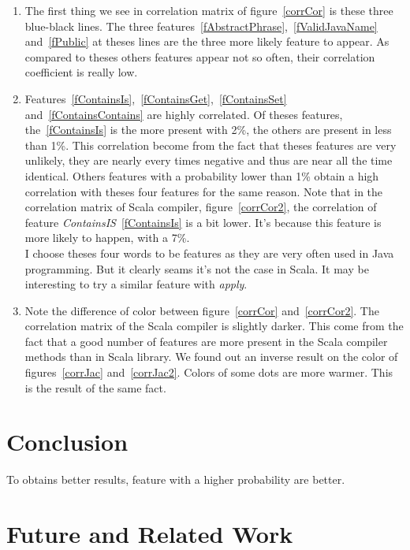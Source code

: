 \documentclass[12pt]{article}
\begin{document}
\begin{enumerate}
\item The first thing we see in correlation matrix of figure~\ref{corrCor} is these three blue-black lines. The three features~\ref{fAbstractPhrase},~\ref{fValidJavaName} and~\ref{fPublic} at theses lines are the three more likely feature to appear. As compared to theses others features appear not so often, their correlation coefficient is really low.
\item Features~\ref{fContainsIs},~\ref{fContainsGet},~\ref{fContainsSet} and~\ref{fContainsContains} are highly correlated. Of theses features, the~\ref{fContainsIs} is the more present with 2\%, the others are present in less than 1\%. This correlation become from the fact that theses features are very unlikely, they are nearly every times negative and thus are near all the time identical. Others features with a probability lower than 1\% obtain a high correlation with theses four features for the same reason. Note that in the correlation matrix of Scala compiler, figure~\ref{corrCor2}, the correlation of feature \textit{ContainsIS}~\ref{fContainsIs} is a bit lower. It's because this feature is more likely to happen, with a 7\%.\\I choose theses four words to be features as they are very often used in Java programming. But it clearly seams it's not the case in Scala. It may be interesting to try a similar feature with \textit{apply}. 
\item Note the difference of color between figure~\ref{corrCor} and~\ref{corrCor2}. The correlation matrix of the Scala compiler is slightly darker. This come from the fact that a good number of features are more present in the Scala compiler methods than in Scala library. We found out an inverse result on the color of figures~\ref{corrJac} and~\ref{corrJac2}. Colors of some dots are more warmer. This is the result of the same fact.
\end{enumerate}

\section {Conclusion} 
To obtains better results, feature with a higher probability are better.

\section {Future and Related Work}
\end{document}
